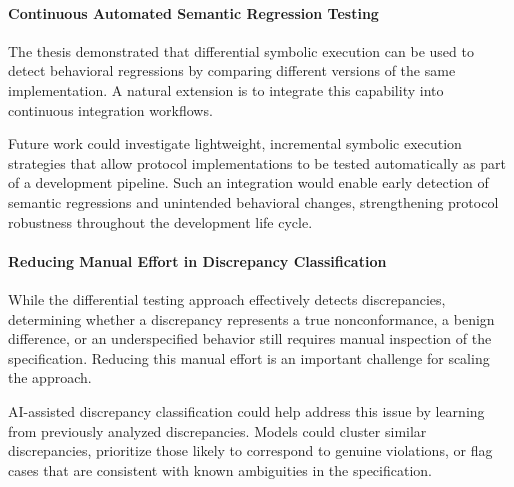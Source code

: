 \paragraph{Continuous Automated Semantic Regression Testing}
The thesis demonstrated that differential symbolic execution can be used to detect behavioral regressions by comparing different versions of the same implementation.
A natural extension is to integrate this capability into continuous integration workflows.

Future work could investigate lightweight, incremental symbolic execution strategies that allow protocol implementations to be tested automatically as part of a development pipeline.
Such an integration would enable early detection of semantic regressions and unintended behavioral changes, strengthening protocol robustness throughout the development life cycle.

\paragraph{Reducing Manual Effort in Discrepancy Classification}
While the differential testing approach effectively detects discrepancies, determining whether a discrepancy represents a true nonconformance, a benign difference, or an underspecified behavior still requires manual inspection of the specification.
Reducing this manual effort is an important challenge for scaling the approach.

AI-assisted discrepancy classification could help address this issue by learning from previously analyzed discrepancies. Models could cluster similar discrepancies, prioritize those likely to correspond to genuine violations, or flag cases that are consistent with known ambiguities in the specification.
